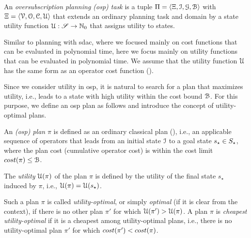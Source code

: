 \begin{definition}\label{def:planning_osp}
    An \emph{oversubscription planning (osp) task} is a tuple $\Pi = \langle {\Xi}, \mathcal I, \mathcal G, \mathcal B \rangle$ with ${\Xi} = \langle \mathcal V, \mathcal O, \mathcal C, \mathcal U\rangle$ that extends an ordinary planning task and domain by a state utility function $\mathcal U : \mathscr S \to \mathbb{N}_0$ that assigns utility to states.
\end{definition}

Similar to planning with sdac, where we focused mainly on cost functions that can be evaluated in polynomial time, here we focus mainly on utility functions that can be evaluated in polynomial time.
We assume that the utility function $\mathcal U$ has the same form as an operator cost function ().

Since we consider utility in osp, it is natural to search for a plan that maximizes utility, i.e., leads to a state with high utility within the cost bound $\mathcal B$. For this purpose, we define an osp plan as follows and introduce the concept of utility-optimal plans.

\begin{definition}\label{def:osp_plan}
    An \emph{(osp) plan} $\pi$ is defined as an ordinary classical plan (), i.e., an applicable sequence of operators that leads from an initial state $\mathcal I$ to a goal state $s_\star \in S_\star$, where the plan cost (cumulative operator cost) is within the cost limit $cost{}(\pi) \leq \mathcal B$.

    The \emph{utility} $\mathcal U(\pi)$ of the plan $\pi$ is defined by the utility of the final state $s_\star$ induced by $\pi$, i.e., $\mathcal U(\pi) = \mathcal U(s_\star)$.

    Such a plan $\pi$ is called \emph{utility-optimal}, or simply \emph{optimal} (if it is clear from the context), if there is no other plan $\pi'$ for which $\mathcal U(\pi') > \mathcal U(\pi)$.
    A plan $\pi$ is \emph{cheapest utility-optimal} if it is a cheapest among utility-optimal plans, i.e., there is no utility-optimal plan $\pi'$ for which $cost(\pi') < cost(\pi)$.
\end{definition}


